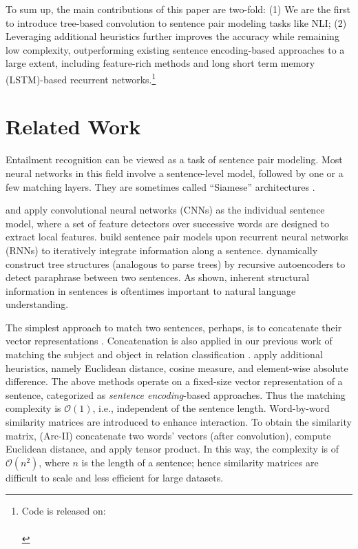 \documentclass[11pt]{article}
\begin{document}
To sum up, the main contributions of this paper are two-fold: (1) We are the first to introduce tree-based convolution to sentence pair modeling tasks like NLI; (2) Leveraging additional heuristics further improves the accuracy while remaining low complexity, outperforming existing sentence encoding-based approaches to a large extent, including feature-rich methods and long short term memory (LSTM)-based recurrent networks.\footnote{
Code is released on:\\
{\color{white}}\quad{}\\
}
 



\vspace{-.1cm}
\section{Related Work}\label{sec:Related}

\vspace{-.1cm}
Entailment recognition can be viewed as a task of sentence pair modeling. Most neural networks in this field involve a sentence-level model, followed by one or a few matching layers. They are sometimes called ``Siamese'' architectures \cite{siamese}.

 and  apply convolutional neural networks (CNNs) as the individual sentence model, where a set of feature detectors over successive words are designed to extract local features.  build sentence pair models upon recurrent neural networks (RNNs) to iteratively integrate information along a sentence.  dynamically construct tree structures (analogous to parse trees) by recursive autoencoders to detect paraphrase between two sentences. As shown, inherent structural information in sentences is oftentimes important to natural language understanding.




The simplest approach to match two sentences, perhaps, is to concatenate their vector representations \cite[Arc-I]{DRR,CNN:NIPS}. Concatenation is also applied in our previous work of matching the subject and object in relation classification \cite{relation,relation2}.  apply additional heuristics, namely Euclidean distance, cosine measure, and element-wise absolute difference.
The above methods operate on a fixed-size vector representation of a sentence, categorized as \textit{sentence encoding}-based approaches. Thus the matching complexity is $\mathcal{O}(1)$, i.e., independent of the sentence length. Word-by-word similarity matrices are introduced to enhance interaction. To obtain the similarity matrix,  (Arc-II) concatenate two words' vectors (after convolution),  compute Euclidean distance, and  apply tensor product. In this way, the complexity is of $\mathcal{O}(n^2)$, where $n$ is the length of a sentence; hence similarity matrices are difficult to scale and less efficient for large datasets.
\end{document}

